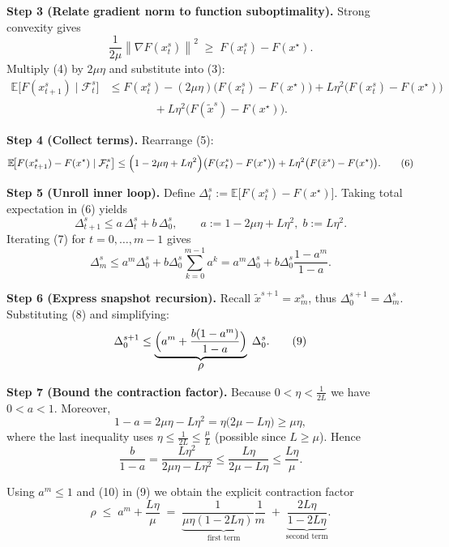 \documentclass{article}
\newcommand{\E}{\mathbb{E}}
\newcommand{\norm}[1]{\left\|#1\right\|}
\begin{document}
\noindent\textbf{Step 3 (Relate gradient norm to function suboptimality).}  
Strong convexity gives
\[
\frac{1}{2\mu}\norm{\nabla F(x_{t}^{s})}^{2}\;\ge\;F(x_{t}^{s})-F(x^{\star}). \tag{4}
\]
Multiply (4) by $2\mu\eta$ and substitute into (3):
\[
\begin{aligned}
\E\!\bigl[F(x_{t+1}^{s})\mid\mathcal{F}_{t}^{s}\bigr]
&\le F(x_{t}^{s})-(2\mu\eta)\bigl(F(x_{t}^{s})-F(x^{\star})\bigr)
   +L\eta^{2}\bigl(F(x_{t}^{s})-F(x^{\star})\bigr) \\
&\qquad\qquad+L\eta^{2}\bigl(F(\tilde{x}^{s})-F(x^{\star})\bigr) .
\end{aligned}
\tag{5}
\]

\noindent\textbf{Step 4 (Collect terms).}  
Rearrange (5):
\[
\E\!\bigl[F(x_{t+1}^{s})-F(x^{\star})\mid\mathcal{F}_{t}^{s}\bigr]
\le\Bigl(1-2\mu\eta+L\eta^{2}\Bigr)\bigl(F(x_{t}^{s})-F(x^{\star})\bigr)
   +L\eta^{2}\bigl(F(\tilde{x}^{s})-F(x^{\star})\bigr). \tag{6}
\]

\noindent\textbf{Step 5 (Unroll inner loop).}  
Define $\Delta_{t}^{s}:=\E\!\bigl[F(x_{t}^{s})-F(x^{\star})\bigr]$. Taking total expectation in (6) yields
\[
\Delta_{t+1}^{s}\le a\,\Delta_{t}^{s}+b\,\Delta_{0}^{s},\qquad
a:=1-2\mu\eta+L\eta^{2},\; b:=L\eta^{2}. \tag{7}
\]
Iterating (7) for $t=0,\dots,m-1$ gives
\[
\Delta_{m}^{s}\le a^{m}\Delta_{0}^{s}+b\Delta_{0}^{s}\sum_{k=0}^{m-1}a^{k}
= a^{m}\Delta_{0}^{s}+b\Delta_{0}^{s}\frac{1-a^{m}}{1-a}. \tag{8}
\]

\noindent\textbf{Step 6 (Express snapshot recursion).}  
Recall $\tilde{x}^{s+1}=x_{m}^{s}$, thus $\Delta_{0}^{s+1}= \Delta_{m}^{s}$. Substituting (8) and simplifying:
\[
\Delta_{0}^{s+1}\le
\underbrace{\Bigl(a^{m}+ \frac{b(1-a^{m})}{1-a}\Bigr)}_{\displaystyle\rho}
\;\Delta_{0}^{s}. \tag{9}
\]

\noindent\textbf{Step 7 (Bound the contraction factor).}  
Because $0<\eta<\frac{1}{2L}$ we have $0<a<1$. Moreover,
\[
1-a = 2\mu\eta - L\eta^{2}= \eta\bigl(2\mu- L\eta\bigr)
\ge \mu\eta,
\]
where the last inequality uses $\eta\le\frac{1}{2L}\le\frac{\mu}{L}$ (possible since $L\ge\mu$). Hence
\[
\frac{b}{1-a}= \frac{L\eta^{2}}{2\mu\eta-L\eta^{2}}
\le \frac{L\eta}{2\mu-L\eta}\le \frac{L\eta}{\mu}. \tag{10}
\]

Using $a^{m}\le 1$ and (10) in (9) we obtain the explicit contraction factor
\[
\rho \;\le\; a^{m}+ \frac{L\eta}{\mu}\;=\;
\underbrace{\frac{1}{\mu\eta(1-2L\eta)}\frac{1}{m}}_{\displaystyle\text{first term}}
\;+\;
\underbrace{\frac{2L\eta}{1-2L\eta}}_{\displaystyle\text{second term}}. \tag{11}
\]
\end{document}
